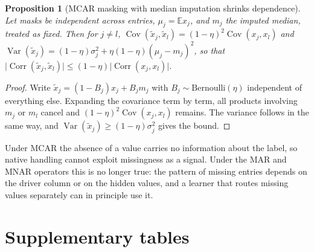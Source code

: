\documentclass[pdflatex,sn-mathphys]{sn-jnl}
\theoremstyle{thmstyleone}
\newtheorem{supproposition}{Proposition}
\begin{document}
\begin{supproposition}[MCAR masking with median imputation shrinks dependence]\label{prop:s_mcar}
Let masks be independent across entries, $\mu_j=\mathbb{E}x_j$, and $m_j$ the imputed median, treated as fixed. Then for $j\neq l$, $\operatorname{Cov}(\tilde x_j,\tilde x_l)=(1-\eta)^{2}\operatorname{Cov}(x_j,x_l)$ and $\operatorname{Var}(\tilde x_j)=(1-\eta)\sigma_j^{2}+\eta(1-\eta)(\mu_j-m_j)^{2}$, so that $\lvert\operatorname{Corr}(\tilde x_j,\tilde x_l)\rvert\le(1-\eta)\lvert\operatorname{Corr}(x_j,x_l)\rvert$.
\end{supproposition}
\begin{proof}
Write $\tilde x_j=(1-B_j)x_j+B_jm_j$ with $B_j\sim\mathrm{Bernoulli}(\eta)$ independent of everything else. Expanding the covariance term by term, all products involving $m_j$ or $m_l$ cancel and $(1-\eta)^{2}\operatorname{Cov}(x_j,x_l)$ remains. The variance follows in the same way, and $\operatorname{Var}(\tilde x_j)\ge(1-\eta)\sigma_j^{2}$ gives the bound.
\end{proof}
Under MCAR the absence of a value carries no information about the label, so native handling cannot exploit missingness as a signal. Under the MAR and MNAR operators this is no longer true: the pattern of missing entries depends on the driver column or on the hidden values, and a learner that routes missing values separately can in principle use it.

\section{Supplementary tables}\label{sup:tables}
\end{document}

